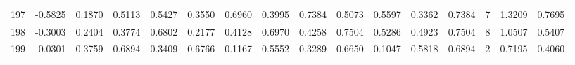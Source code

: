 \begin{tabular}{lrrrrrrrrrrrrrrr}
197 &     -0.5825 &  0.1870 &  0.5113 &  0.5427 &  0.3550 &  0.6960 &  0.3995 &  0.7384 &  0.5073 &  0.5597 &   0.3362 &     0.7384 &      7 &                    1.3209 &                     0.7695 \\
198 &     -0.3003 &  0.2404 &  0.3774 &  0.6802 &  0.2177 &  0.4128 &  0.6970 &  0.4258 &  0.7504 &  0.5286 &   0.4923 &     0.7504 &      8 &                    1.0507 &                     0.5407 \\
199 &     -0.0301 &  0.3759 &  0.6894 &  0.3409 &  0.6766 &  0.1167 &  0.5552 &  0.3289 &  0.6650 &  0.1047 &   0.5818 &     0.6894 &      2 &                    0.7195 &                     0.4060 \\
\bottomrule
\end{tabular}
